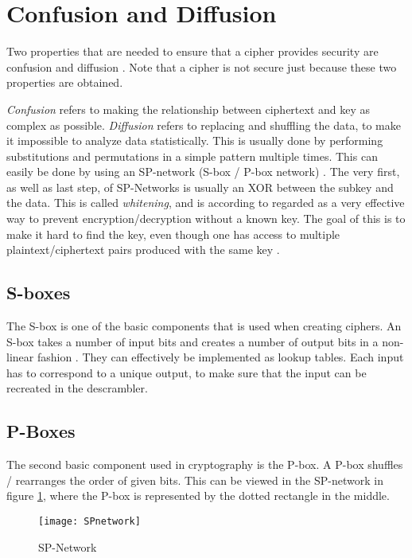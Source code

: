 \section{Confusion and Diffusion}\label{ch:ConfDiff}
Two properties that are needed to ensure that a cipher provides 
security are confusion and diffusion \citep{Shannon:1949}. Note that a 
cipher is not secure just because these two properties are obtained.

\emph{Confusion} refers to making the relationship between ciphertext 
and key as complex as possible. \emph{Diffusion} refers to replacing 
and shuffling the data, to make it impossible to analyze data 
statistically. This is usually done by performing substitutions and 
permutations in a simple pattern multiple times. This can easily be 
done by using an SP-network (S-box / P-box network) 
\citep[pp. 74--79]{Stinson:2006}. The very first, as well as last step, 
of SP-Networks is usually an XOR between the subkey and the data. This 
is called \emph{whitening}, and is according to 
\citet[p. 75]{Stinson:2006} regarded as a very effective way to prevent 
encryption/decryption without a known key. The goal of this is to make 
it hard to find the key, even though one has access to multiple 
plaintext/ciphertext pairs produced with the same key 
\citep{Shannon:1949}.

\subsection{S-boxes}
The S-box is one of the basic components that is used when creating 
ciphers. An S-box takes a number of input bits and creates a number of 
output bits in a non-linear fashion \citep[pp. 74--75]{Stinson:2006}. 
They can effectively be implemented as lookup tables. Each input has to 
correspond to a unique output, to make sure that the input can be 
recreated in the descrambler.


\subsection{P-Boxes}
The second basic component used in cryptography is the P-box. A P-box 
shuffles / rearranges the order of given bits. This can be viewed in 
the SP-network in figure \ref{img:SPNetwork}, where the P-box is 
represented by the dotted rectangle in the middle.

\begin{figure}
  \begin{center}
    \texttt{[image: SPnetwork]}
    \caption{SP-Network}
    \label{img:SPNetwork}
  \end{center}
\end{figure}

